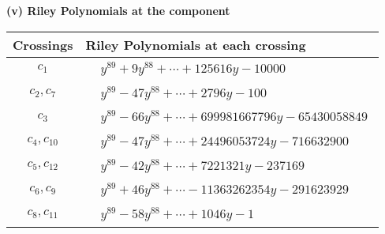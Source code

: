\documentclass[1p]{elsarticle_modified}
\theoremstyle{definition}
\begin{document}
\flushleft \textbf{(v) Riley Polynomials at the component}\newline \\
\begin{tabular}{m{50pt}|m{274pt}}
Crossings & \hspace{64pt}Riley Polynomials at each crossing \\
\hline $$\begin{aligned}c_{1}\end{aligned}$$&$\begin{aligned}
&y^{89}+9 y^{88}+\cdots+125616 y-10000
\end{aligned}$\\
\hline $$\begin{aligned}c_{2},c_{7}\end{aligned}$$&$\begin{aligned}
&y^{89}-47 y^{88}+\cdots+2796 y-100
\end{aligned}$\\
\hline $$\begin{aligned}c_{3}\end{aligned}$$&$\begin{aligned}
&y^{89}-66 y^{88}+\cdots+699981667796 y-65430058849
\end{aligned}$\\
\hline $$\begin{aligned}c_{4},c_{10}\end{aligned}$$&$\begin{aligned}
&y^{89}-47 y^{88}+\cdots+24496053724 y-716632900
\end{aligned}$\\
\hline $$\begin{aligned}c_{5},c_{12}\end{aligned}$$&$\begin{aligned}
&y^{89}-42 y^{88}+\cdots+7221321 y-237169
\end{aligned}$\\
\hline $$\begin{aligned}c_{6},c_{9}\end{aligned}$$&$\begin{aligned}
&y^{89}+46 y^{88}+\cdots-11363262354 y-291623929
\end{aligned}$\\
\hline $$\begin{aligned}c_{8},c_{11}\end{aligned}$$&$\begin{aligned}
&y^{89}-58 y^{88}+\cdots+1046 y-1
\end{aligned}$\\
\hline
\end{tabular}\\~\\
\end{document}

